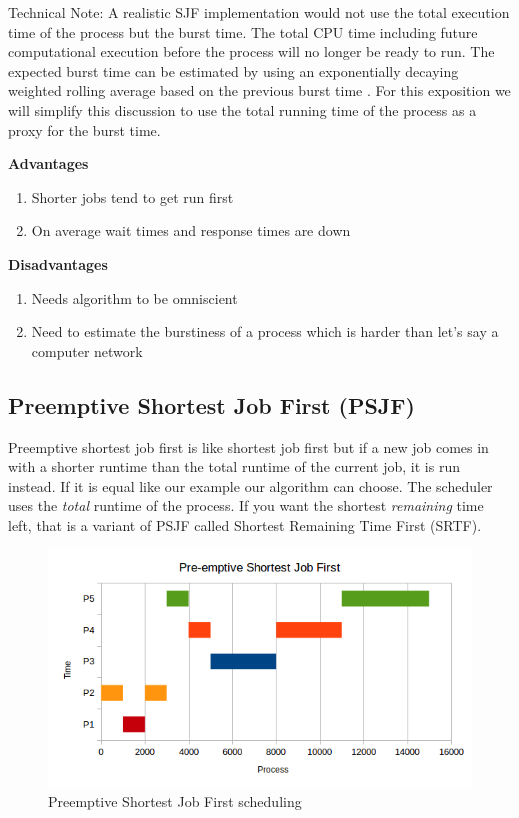 Technical Note: A realistic SJF implementation would not use the total execution time of the process but the burst time.
The total CPU time including future computational execution before the process will no longer be ready to run.
The expected burst time can be estimated by using an exponentially decaying weighted rolling average based on the previous burst time .
For this exposition we will simplify this discussion to use the total running time of the process as a proxy for the burst time.

\textbf{Advantages}

\begin{enumerate}
  \item Shorter jobs tend to get run first
  \item On average wait times and response times are down
\end{enumerate}

\textbf{Disadvantages}
\begin{enumerate}
  \item Needs algorithm to be omniscient
  \item Need to estimate the burstiness of a process which is harder than let's say a computer network
\end{enumerate}

\subsection{Preemptive Shortest Job First (PSJF)}

Preemptive shortest job first is like shortest job first but if a new job comes in with a shorter runtime than the total runtime of the current job, it is run instead.
If it is equal like our example our algorithm can choose.
The scheduler uses the \emph{total} runtime of the process.
If you want the shortest \emph{remaining} time left, that is a variant of PSJF called Shortest Remaining Time First (SRTF).

\begin{figure}[htbp]
\centering
\includegraphics[width=\textwidth]{scheduling/images/psjf.png}
\caption{Preemptive Shortest Job First scheduling}
\end{figure}

